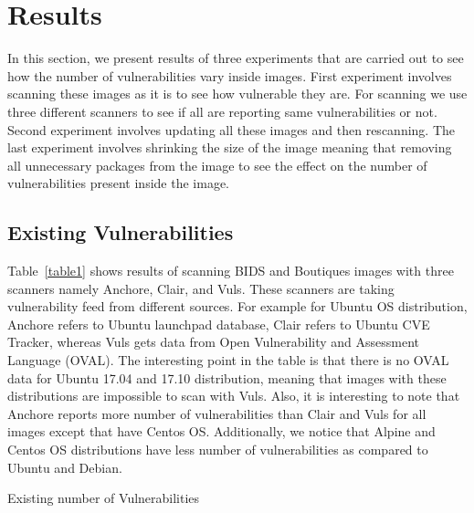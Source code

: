 \documentclass[a4paper,num-refs]{oup-contemporary}
\begin{document}
\section{Results}

In this section, we present results of three experiments that are carried out to see
how the number of vulnerabilities vary inside images. First experiment involves scanning
these images as it is to see how vulnerable they are. For scanning we use three different scanners
to see if all are reporting same vulnerabilities or not. Second experiment involves updating
all these images and then rescanning. The last experiment involves shrinking the size of the image
meaning that removing all unnecessary packages from the image to see the effect on the number of
vulnerabilities present inside the image.

\subsection{Existing Vulnerabilities}

Table~\ref{table1} shows results of scanning BIDS and Boutiques images with three scanners namely
Anchore, Clair, and Vuls. These scanners are taking vulnerability feed from different sources. For
example for Ubuntu OS distribution, Anchore refers to Ubuntu launchpad database, Clair refers to
Ubuntu CVE Tracker, whereas Vuls gets data from Open Vulnerability and Assessment Language (OVAL).
The interesting point in the table is that there is no OVAL data for Ubuntu 17.04 and 17.10 distribution,
meaning that images with these distributions are impossible to scan with Vuls. Also, it is interesting to note that
Anchore reports more number of vulnerabilities than Clair and Vuls for all images except that have Centos OS.
Additionally, we notice that Alpine and Centos OS distributions have less number of vulnerabilities as
compared to Ubuntu and Debian.

\begin{table}
%
       \centering
	\caption{\label{table1}Existing number of Vulnerabilities}
\end{table}
\end{document}
